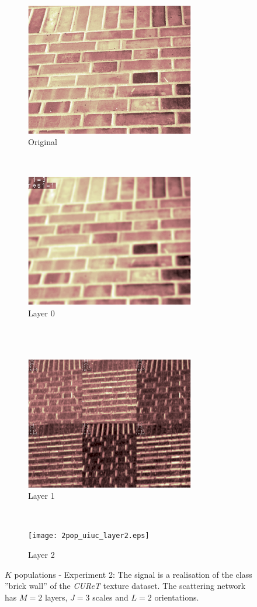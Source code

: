 \documentclass[a4paper,11pt]{report}
\begin{document}
 
		\begin{figure}[h]
			\centering
			\begin{subfigure}[t]{0.48\textwidth}
				\centering
				\includegraphics[height=2.3in]{2pop_uiuc_original.eps}
				\caption{Original}
			\end{subfigure}%
			~
			\begin{subfigure}[t]{0.48\textwidth}
				\centering
				\includegraphics[height=2.3in]{2pop_uiuc_layer0.eps}
				\caption{Layer 0}
			\end{subfigure}%
			\\
			~
			\begin{subfigure}[t]{0.48\textwidth}
				\centering
				\includegraphics[height=2.3in]{2pop_uiuc_layer1.eps}
				\caption{Layer 1}
			\end{subfigure}
			~ 
			\begin{subfigure}[t]{0.48\textwidth}
				\centering
				\texttt{[image: 2pop\_uiuc\_layer2.eps]}
				\caption{Layer 2}
			\end{subfigure}
			\caption[$K$ populations - Experiment 2.]{\centering $K$ populations - Experiment 2: The signal is a realisation of the class ''brick wall'' of the \textit{CUReT} texture dataset. The scattering network has $M=2$ layers, $J=3$ scales and $L=2$ orientations.}
			\label{fig:2pop - 2}
		\end{figure}
\end{document}
